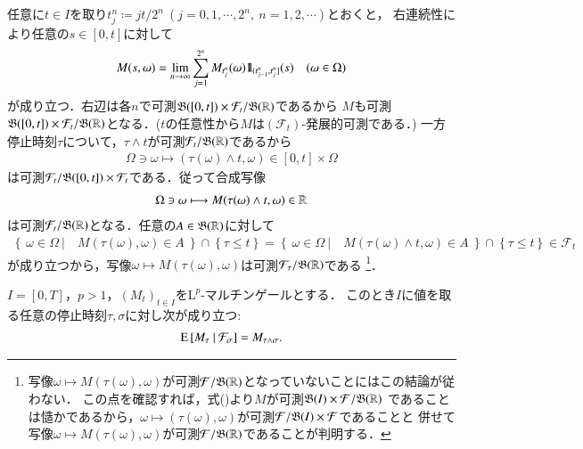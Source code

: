 	\begin{prf}
		任意に$t \in I$を取り$t_j^n \coloneqq jt/2^n\ (j=0,1,\cdots,2^n,\ n=1,2,\cdots)$とおくと，
		右連続性により任意の$s \in [0,t]$に対して
		\begin{align}
			M(s,\omega) = \lim_{n \to \infty} \sum_{j=1}^{2^n} M_{t_j^n}(\omega) \mbox{1}\hspace{-0.25em}\mbox{l}_{(t_{j-1}^n,t_j^n]}(s) \quad (\omega \in \Omega)
			\label{eq:stopping_time_measurability}
		\end{align}
		が成り立つ．右辺は各$n$で可測$\mathfrak{B}([0,t]) \times \mathcal{F}_t/\mathfrak{B}(\mathbb{R})$であるから
		$M$も可測$\mathfrak{B}([0,t]) \times \mathcal{F}_t/\mathfrak{B}(\mathbb{R})$となる．($t$の任意性から$M$は$(\mathcal{F}_t)$-発展的可測である．)
		一方停止時刻$\tau$について，$\tau \wedge t$が可測$\mathcal{F}_t/\mathfrak{B}(\mathbb{R})$であるから
		\begin{align}
			\Omega \ni \omega \longmapsto (\tau(\omega) \wedge t, \omega) \in [0,t] \times \Omega
		\end{align}
		は可測$\mathcal{F}_t/\mathfrak{B}([0,t]) \times \mathcal{F}_t$である．従って合成写像
		\begin{align}
			\Omega \ni \omega \longmapsto M(\tau(\omega) \wedge t,\omega) \in \mathbb{R}
		\end{align}
		は可測$\mathcal{F}_t/\mathfrak{B}(\mathbb{R})$となる．任意の$A \in \mathfrak{B}(\mathbb{R})$に対して
		\begin{align}
			\left\{\ \omega \in \Omega\ |\quad M(\tau(\omega),\omega) \in A\ \right\} \cap \left\{ \tau \leq t \right\}
			= \left\{\ \omega \in \Omega\ |\quad M(\tau(\omega) \wedge t,\omega) \in A\ \right\} \cap \left\{ \tau \leq t \right\}
			\in \mathcal{F}_t
		\end{align}
		が成り立つから，写像$\omega \longmapsto M(\tau(\omega),\omega)$は可測$\mathcal{F}_\tau/\mathfrak{B}(\mathbb{R})$である
		\footnote{
			写像$\omega \longmapsto M(\tau(\omega),\omega)$が可測$\mathcal{F}/\mathfrak{B}(\mathbb{R})$となっていないことにはこの結論が従わない．
			この点を確認すれば，式()より$M$が可測$\mathfrak{B}(I) \times \mathcal{F}/\mathfrak{B}(\mathbb{R})$
			であることは慥かであるから，$\omega \longmapsto (\tau(\omega),\omega)$が可測$\mathcal{F}/\mathfrak{B}(I)\times\mathcal{F}$であることと
			併せて写像$\omega \longmapsto M(\tau(\omega),\omega)$が可測$\mathcal{F}/\mathfrak{B}(\mathbb{R})$であることが判明する．
		}．
		\QED
	\end{prf}
	
	\begin{itembox}[l]{}
		\begin{thm}[任意抽出定理(2)]
			$I = [0,T]$，$p > 1$，$(M_t)_{t \in I}$を$\mathrm{L}^p$-マルチンゲールとする．
			このとき$I$に値を取る任意の停止時刻$\tau,\sigma$に対し次が成り立つ:
			\begin{align}
				\operatorname{E} \left[ M_\tau \ \middle|\ \mathcal{F}_\sigma \right] = M_{\tau \wedge \sigma}.
			\end{align}
		\end{thm}
	\end{itembox}
	
